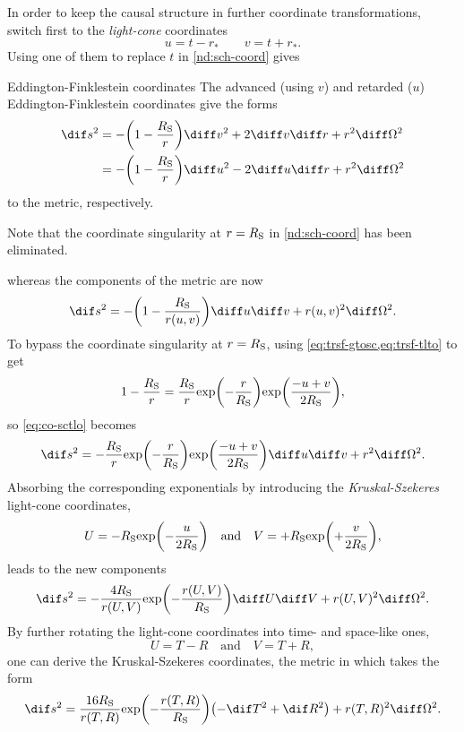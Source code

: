 In order to keep the causal structure in further coordinate transformations,
switch first to the \emph{light-cone} coordinates
\begin{equation}
u = t-r_*\qquad v = t+r_*.
\label{eq:trsf-tlto}
\end{equation}
Using one of them to replace $t$ in \cref{nd:sch-coord} gives
\begin{nameddef}{Eddington-Finklestein coordinates}
The advanced (using $v$) and retarded ($u$) Eddington-Finklestein
coordinates give the forms
\begin{align}
\dif s^2
&= -\rbr{1-\frac{\rSch}{r}}\diff v^2 + 2\diff v\diff r + r^2\diff\Omega^2 \\
&= -\rbr{1-\frac{\rSch}{r}}\diff u^2 - 2\diff u\diff r + r^2\diff\Omega^2 
\end{align}
to the metric, respectively.
\end{nameddef}
Note that the coordinate singularity at $r=R_\text{S}$ in \cref{nd:sch-coord} has
been eliminated.

whereas the components of the metric are now
\begin{equation}
\dif s^2 = -\rbr{1-\frac{\rSch}{\rfun{r}{u, v}}}\diff u\diff v
+\rfun{r}{u, v}^2\diff\Omega^2.
\label{eq:co-sctlo}
\end{equation}
To bypass the coordinate singularity at $r = R_\text{S}$, using
\cref{eq:trsf-gtosc,eq:trsf-tlto} to get
\begin{equation}
1-\frac{R_\text{S}}{r} = \frac{R_\text{S}}{r}{\exp}\mathopen{}\left(-\frac{r}{R_\text{S}}\right)\mathclose{}
{\exp}\mathopen{}\left(\frac{-u+v}{2R_\text{S}}\right)\mathclose{},
\end{equation}
so \cref{eq:co-sctlo} becomes
\begin{equation}
\dif s^2 = -\frac{\rSch}{r}\rfun{\exp}{-\frac{r}{\rSch}}
\rfun{\exp}{\frac{-u+v}{2\rSch}}\diff u\diff v
+ r^2\diff\Omega^2.
\end{equation}
Absorbing the corresponding exponentials by introducing the
\emph{Kruskal-Szekeres} light-cone coordinates,
\begin{equation}
U = -R_\text{S} {\exp}\mathopen{}\left(-\frac{u}{2R_\text{S}}\right)\mathclose{}
\quad\text{and}\quad
V = +R_\text{S} {\exp}\mathopen{}\left(+\frac{v}{2R_\text{S}}\right)\mathclose{},
\end{equation}
leads to the new components
\begin{equation}
\dif s^2 = -\frac{4\rSch}{\rfun{r}{U,V}}\rfun{\exp}{-\frac{\rfun{r}{U,V}}{\rSch}}
\diff U\diff V + \rfun{r}{U,V}^2\diff\Omega^2.
\end{equation}
By further rotating the light-cone coordinates into time- and space-like ones,
\begin{equation}
U = T-R\quad\text{and}\quad V = T+R,
\end{equation}
one can derive the Kruskal-Szekeres coordinates, the metric in
which takes the form
\begin{equation}
\dif s^2 = \frac{16\rSch}{\rfun{r}{T,R}}\rfun{\exp}{-\frac{\rfun{r}{T,R}}{\rSch}}
\rbr{-\dif T^2 + \dif R^2} + \rfun{r}{T,R}^2\diff\Omega^2.
\end{equation}

